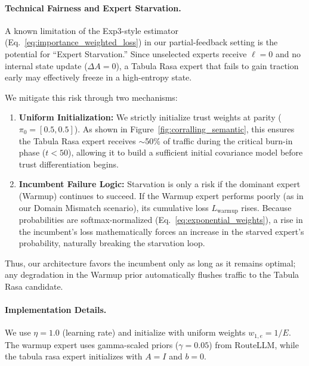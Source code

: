 \paragraph{Technical Fairness and Expert Starvation.}
A known limitation of the Exp3-style estimator (Eq.~\ref{eq:importance_weighted_loss}) in our partial-feedback setting is the potential for ``Expert Starvation.'' Since unselected experts receive $\ell=0$ and no internal state update ($\Delta A = 0$), a Tabula Rasa expert that fails to gain traction early may effectively freeze in a high-entropy state.

We mitigate this risk through two mechanisms:
\begin{enumerate}[nosep]
    \item \textbf{Uniform Initialization:} We strictly initialize trust weights at parity ($\pi_0 = [0.5, 0.5]$). As shown in Figure~\ref{fig:corralling_semantic}, this ensures the Tabula Rasa expert receives $\sim$50\% of traffic during the critical burn-in phase ($t < 50$), allowing it to build a sufficient initial covariance model before trust differentiation begins.
    \item \textbf{Incumbent Failure Logic:} Starvation is only a risk if the dominant expert (Warmup) continues to succeed. If the Warmup expert performs poorly (as in our Domain Mismatch scenario), its cumulative loss $L_{\text{warmup}}$ rises. Because probabilities are softmax-normalized (Eq.~\ref{eq:exponential_weights}), a rise in the incumbent's loss mathematically forces an increase in the starved expert's probability, naturally breaking the starvation loop.
\end{enumerate}

Thus, our architecture favors the incumbent only as long as it remains optimal; any degradation in the Warmup prior automatically flushes traffic to the Tabula Rasa candidate.

\paragraph{Implementation Details.}
We use $\eta = 1.0$ (learning rate) and initialize with uniform weights $w_{1,e} = 1/E$.
The warmup expert uses gamma-scaled priors ($\gamma = 0.05$) from RouteLLM, while the tabula rasa expert initializes with $A = I$ and $b = 0$.

